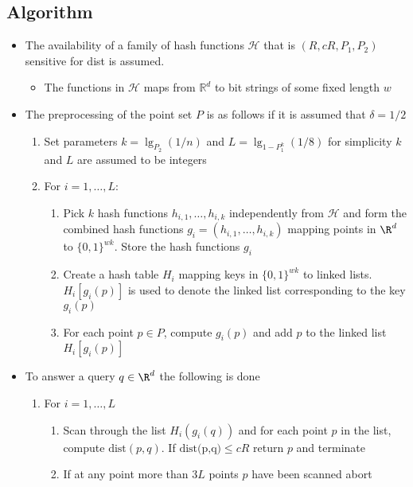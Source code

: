 \subsection{Algorithm}
\begin{itemize}
  \item The availability of a family of hash functions $\mathcal H$ that is $(R, cR, P_1, P_2)$ sensitive for dist is assumed.
  \begin{itemize}
	  \item The functions in $\mathcal H$ maps from $\mathbb R^d$ to bit strings of some fixed length $w$
  \end{itemize}
  \item The preprocessing of the point set $P$ is as follows if it is assumed that $\delta = 1/2$
  \begin{enumerate}
  	\item Set parameters $k = \lg_{P_2}(1/n)$ and $L = \lg_{1-P_1^k}(1/8)$ for simplicity $k$ and $L$ are assumed to be integers
    \item For $i = 1, \dots, L$: 
    \begin{enumerate}
    	\item Pick $k$ hash functions $h_{i,1}, \dots, h_{i,k}$ independently from $\mathcal H$ and form the combined hash functions $g_i=(h_{i,1}, \dots, h_{i,k})$ mapping points in $\R^d$ to $\{0,1\}^{wk}$. Store the hash functions $g_i$
      \item Create a hash table $H_i$ mapping keys in $\{0,1\}^{wk}$ to linked lists. $H_i[g_i(p)]$ is used to denote the linked list corresponding to the key $g_i(p)$
      \item For each point $p \in P$, compute $g_i(p)$ and add $p$ to the linked list $H_i[g_i(p)]$
    \end{enumerate}
  \end{enumerate}
  \item To answer a query $q \in \R^d$ the following is done
  \begin{enumerate}
  	\item For $i= 1, \dots, L$
    \begin{enumerate}
    	\item Scan through the list $H_i(g_i(q))$ and for each point $p$ in the list, compute $\text{dist}(p,q)$. If $\text{dist(p,q)} \leq cR$ return $p$ and terminate
      \item If at any point more than $3L$ points $p$ have been scanned abort
    \end{enumerate}
  \end{enumerate}

\end{itemize}
